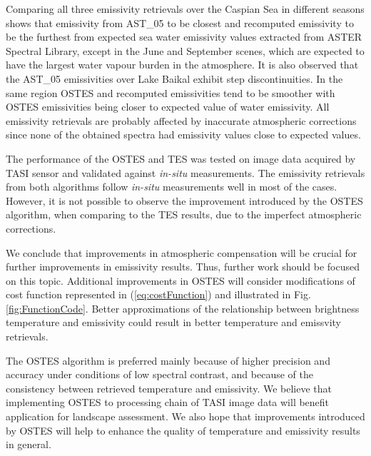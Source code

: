 Comparing all three emissivity retrievals over the Caspian Sea in different seasons shows that emissivity from AST\_05 to be closest and recomputed emissivity to be the furthest from expected sea water emissivity values extracted from ASTER Spectral Library, except in the June and September scenes, which are expected to have the largest water vapour burden in the atmosphere. It is also observed that the AST\_05 emissivities over Lake Baikal exhibit step discontinuities. In the same region OSTES and recomputed emissivities tend to be smoother with OSTES emissivities being closer to expected value of water emissivity. All emissivity retrievals are probably affected by inaccurate atmospheric corrections since none of the obtained spectra had emissivity values close to expected values.

The performance of the OSTES and TES was tested on image data acquired by TASI sensor and validated against \textit{in-situ} measurements. The emissivity retrievals from both algorithms follow \textit{in-situ} measurements well in most of the cases. However, it is not possible to observe the improvement introduced by the OSTES algorithm, when comparing to the TES results, due to the imperfect atmospheric corrections.

We conclude that improvements in atmospheric compensation will be crucial for further improvements in emissivity results. Thus, further work should be focused on this topic. Additional improvements in OSTES will consider modifications of cost function represented in (\ref{eq:costFunction}) and illustrated in Fig. \ref{fig:FunctionCode}. Better approximations of the relationship between brightness temperature and emissivity could result in better temperature and emissvity retrievals.


The OSTES algorithm is preferred mainly because of higher precision and accuracy under conditions of low spectral contrast, and because of the consistency between retrieved temperature and emissivity. We believe that implementing OSTES to processing chain of TASI image data will benefit application for landscape assessment. We also hope that improvements introduced by OSTES will help to enhance the quality of temperature and emissivity results in general.



